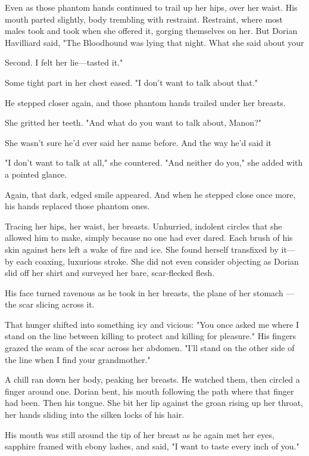 Even as those phantom hands continued to trail up her hips, over her waist. His mouth parted slightly, body trembling with restraint. Restraint, where most males took and took when she offered it, gorging themselves on her. But Dorian Havilliard said, "The Bloodhound was lying that night. What she said about your

Second. I felt her lie---tasted it."

Some tight part in her chest eased. "I don't want to talk about that."

He stepped closer again, and those phantom hands trailed under her breasts.

She gritted her teeth. "And what do you want to talk about, Manon?"

She wasn't sure he'd ever said her name before. And the way he'd said it


"I don't want to talk at all," she countered. "And neither do you," she added with a pointed glance.

Again, that dark, edged smile appeared. And when he stepped close once more, his hands replaced those phantom ones.

Tracing her hips, her waist, her breasts. Unhurried, indolent circles that she allowed him to make, simply because no one had ever dared. Each brush of his skin against hers left a wake of fire and ice. She found herself transfixed by it--- by each coaxing, luxurious stroke. She did not even consider objecting as Dorian slid off her shirt and surveyed her bare, scar-flecked flesh.

His face turned ravenous as he took in her breasts, the plane of her stomach ---the scar slicing across it.

That hunger shifted into something icy and vicious: "You once asked me where I stand on the line between killing to protect and killing for pleasure." His fingers grazed the seam of the scar across her abdomen. "I'll stand on the other side of the line when I find your grandmother."

A chill ran down her body, peaking her breasts. He watched them, then circled a finger around one. Dorian bent, his mouth following the path where that finger had been. Then his tongue. She bit her lip against the groan rising up her throat, her hands sliding into the silken locks of his hair.

His mouth was still around the tip of her breast as he again met her eyes, sapphire framed with ebony lashes, and said, "I want to taste every inch of you."


